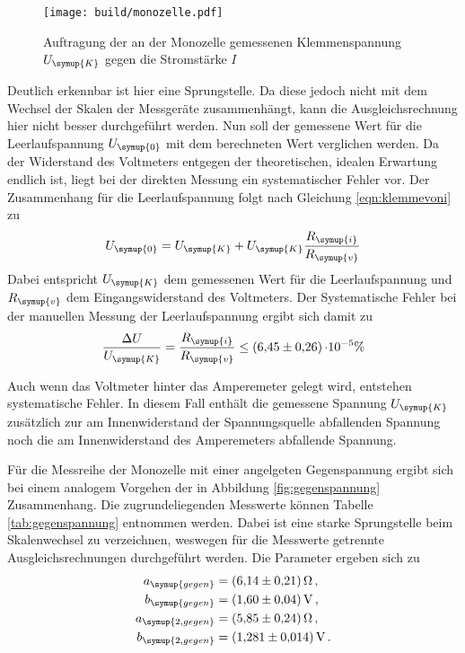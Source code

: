 \begin{figure}
  \centering
  \texttt{[image: build/monozelle.pdf]}
  \caption{Auftragung der an der Monozelle gemessenen Klemmenspannung $U_{\symup{K}}$
  gegen die Stromstärke $I$}
  \label{fig:monozelle}
\end{figure}

Deutlich erkennbar ist hier eine Sprungstelle. Da diese jedoch nicht mit dem Wechsel
der Skalen der Messgeräte zusammenhängt, kann die Ausgleichsrechnung hier nicht besser durchgeführt
werden.
Nun soll der gemessene Wert für die Leerlaufspannung $U_{\symup{0}}$ mit dem
berechneten Wert verglichen werden. Da der Widerstand des Voltmeters entgegen
der theoretischen, idealen Erwartung endlich ist, liegt bei der direkten Messung
ein systematischer Fehler vor. Der Zusammenhang für die Leerlaufspannung folgt
nach Gleichung \eqref{eqn:klemmevoni} zu
\begin{equation}
  U_{\symup{0}}=U_{\symup{K}}+U_{\symup{K}}\frac{R_{\symup{i}}}{R_{\symup{v}}}
\end{equation}
Dabei entspricht $U_{\symup{K}}$ dem gemessenen Wert für die Leerlaufspannung
und $R_{\symup{v}}$ dem Eingangswiderstand des Voltmeters.
Der Systematische Fehler bei der manuellen Messung der Leerlaufspannung ergibt
sich damit zu
\begin{equation}
  \frac{\Delta U}{U_{\symup{K}}}=\frac{R_{\symup{i}}}{R_{\symup{v}}} \leq \SI{6.45(026)}\cdot10^{-5}\%
\end{equation}

Auch wenn das Voltmeter hinter das Amperemeter gelegt wird, entstehen systematische
Fehler. In diesem Fall enthält die gemessene Spannung $U_{\symup{K}}$ zusätzlich
zur am Innenwiderstand der Spannungsquelle abfallenden Spannung noch die am Innenwiderstand
des Amperemeters abfallende Spannung.

Für die Messreihe der Monozelle mit einer angelgeten Gegenspannung ergibt sich
bei einem analogem Vorgehen der in Abbildung \ref{fig:gegenspannung} Zusammenhang.
Die zugrundeliegenden Messwerte können Tabelle \ref{tab:gegenspannung} entnommen werden.
Dabei ist eine starke Sprungstelle beim Skalenwechsel zu verzeichnen, weswegen für
die Messwerte getrennte Ausgleichsrechnungen durchgeführt werden. Die Parameter ergeben sich zu
\begin{align}
  a_{\symup{gegen}} &= \SI{6.14(021)}{\ohm}\,,\\
  b_{\symup{gegen}} &= \SI{1.60(004)}{\volt}\,,\\
  a_{\symup{2,gegen}} &= \SI{5.85(024)}{\ohm}\,,\\
  b_{\symup{2,gegen}} &= \SI{1.281(0014)}{\volt}\,.
\end{align}

